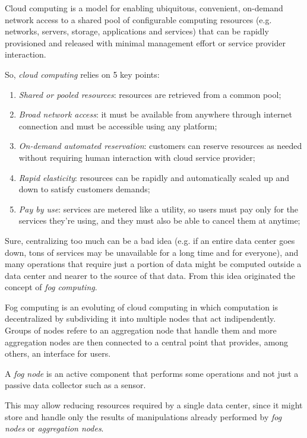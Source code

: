 \begin{definition}
    Cloud computing is a model for enabling ubiquitous, convenient,
    on-demand network access to a shared pool of configurable computing
    resources (e.g. networks, servers, storage, applications and services) that
    can be rapidly provisioned and released with minimal management effort
    or service provider interaction.
\end{definition}

\noindent
So, \emph{cloud computing} relies on 5 key points:
\begin{enumerate}
    \item\emph{Shared or pooled resources}: resources are retrieved from a
    common pool;
    \item\emph{Broad network access}: it must be available from anywhere
    through internet connection and must be accessible using any platform;
    \item\emph{On-demand automated reservation}: customers can reserve
    resources as needed without requiring human interaction with cloud service
    provider;
    \item\emph{Rapid elasticity}: resources can be rapidly and automatically
    scaled up and down to satisfy customers demands;
    \item\emph{Pay by use}: services are metered like a utility, so users must
    pay only for the services they're using, and they must also be able to
    cancel them at anytime;
\end{enumerate}\noindent
Sure, centralizing too much can be a bad idea (e.g. if an entire data center
goes down, tons of services may be unavailable for a long time and for
everyone), and many operations that require just a  portion of
data might be computed outside a data center and nearer to the source of that
data. From this idea originated the concept of \emph{fog computing}.

\begin{definition}
    Fog computing is an evoluting of cloud computing in which computation is
    decentralized by subdividing it into multiple nodes that act indipendently.
    Groups of nodes refere to an aggregation node that handle them and
    more aggregation nodes are then connected to a central point that provides,
    among others, an interface for users.
\end{definition}
\begin{note}
    A \emph{fog node} is an active component that performs some operations
    and not just a passive data collector such as a sensor.
\end{note}

\noindent
This may allow reducing resources required by a single data center, since it
might store and handle only the results of manipulations already performed by
\emph{fog nodes} or \emph{aggregation nodes}.